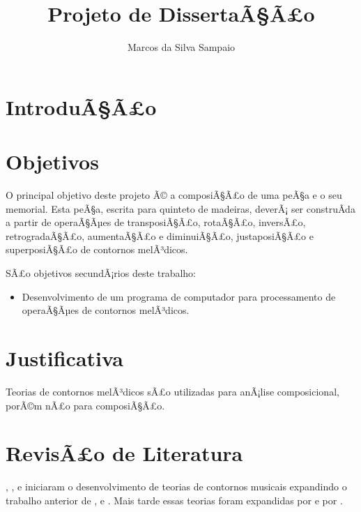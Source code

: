 \documentclass{article}
\begin{document}
\title{Projeto de DissertaÃ§Ã£o}
\author{Marcos da Silva Sampaio}
\maketitle

\thispagestyle{empty}

\setlength{\parindent}{0cm}

\section{IntroduÃ§Ã£o}
\label{sec:introducao}

\section{Objetivos}
\label{sec:objetivos}

O principal objetivo deste projeto Ã© a composiÃ§Ã£o de uma peÃ§a e o seu
memorial. Esta peÃ§a, escrita para quinteto de madeiras, deverÃ¡ ser
construÃ­da a partir de operaÃ§Ãµes de transposiÃ§Ã£o, rotaÃ§Ã£o, inversÃ£o,
retrogradaÃ§Ã£o, aumentaÃ§Ã£o e diminuiÃ§Ã£o, justaposiÃ§Ã£o e superposiÃ§Ã£o de
contornos melÃ³dicos.

SÃ£o objetivos secundÃ¡rios deste trabalho:

\begin{itemize}
\item Desenvolvimento de um programa de computador para processamento
  de operaÃ§Ãµes de contornos melÃ³dicos.
\end{itemize}

\section{Justificativa}
\label{sec:justificativa}


Teorias de contornos melÃ³dicos sÃ£o utilizadas para anÃ¡lise
composicional, porÃ©m nÃ£o para composiÃ§Ã£o.

\section{RevisÃ£o de Literatura}
\label{sec:revis-de-liter}

,
, 
e  iniciaram o
desenvolvimento de teorias de contornos musicais expandindo o trabalho
anterior de ,
 e
. Mais tarde essas teorias foram expandidas
por  e por
.
\end{document}
